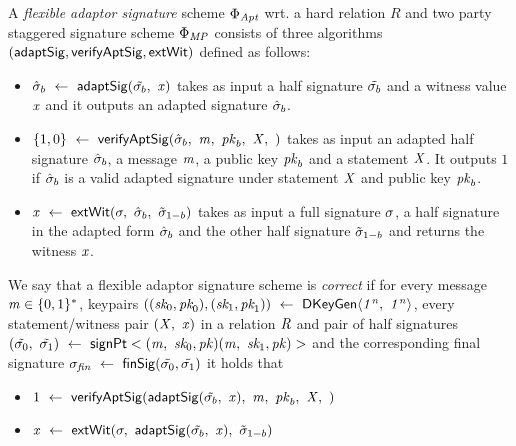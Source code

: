 \begin{definition}
A \emph{flexible adaptor signature} scheme $\Phi_{\mathit{Apt}}$ wrt. a hard relation $R$ and two party staggered signature scheme $\Phi_{\mathit{MP}}$ consists of three algorithms $(\mathsf{adaptSig}, \mathsf{verifyAptSig}, \mathsf{extWit})$ defined as follows:


\begin{itemize}
        \item $\hat{\sigma}_b ~\leftarrow~ \mathsf{adaptSig}(\tilde{\sigma_b} ,~ \mathit{x})$ takes as input a half signature $\tilde{\sigma_b}$ and a witness value $\mathit{x}$ and it outputs an adapted signature $\hat{\sigma}_b$. 
        \item $\{1,0\} ~\leftarrow~ \mathsf{verifyAptSig}(\hat{\sigma}_b ,~ \mathit{m} ,~ \mathit{pk}_b ,~ \mathit{X} ,~ )$ takes as input an adapted half signature $\hat{\sigma}_b$, a message $\mathit{m}$, a public key $\mathit{pk}_b$ and a statement $\mathit{X}$.  It outputs $1$ if $\hat{\sigma}_b$ is a valid adapted signature under statement $\mathit{X}$ and public key  $\mathit{pk}_b$. 
        \item $\mathit{x} ~\leftarrow~ \mathsf{extWit}(\sigma ,~ \hat{\sigma}_b ,~ \tilde{\sigma}_{1-b})$ takes as input a full signature $\sigma$, a half signature in the adapted form $\hat{\sigma}_b$ and the other half signature $\tilde{\sigma}_{1-b}$ and returns the witness $\mathit{x}$.
    \end{itemize}

\end{definition}




\begin{definition}
We say that a flexible adaptor signature scheme is \emph{correct} if for every message $\mathit{m} \in \{0,1\}^{*}$, keypairs $((\textit{sk}_0, \textit{pk}_0), (\textit{sk}_1, \textit{pk}_1)) ~\leftarrow~ \mathsf{DKeyGen}\langle \mathit{1^n} ,~ \mathit{1^n} \rangle$, every statement/witness pair $(\mathit{X} ,~ \mathit{x})$ in a relation $\mathit{R}$ and pair of half signatures $(\tilde{\sigma_0} ,~ \tilde{\sigma_1}) ~\leftarrow~ \mathsf{signPt}<(\mathit{m} ,~ \textit{sk}_0, \mathit{pk})(\mathit{m} ,~ \textit{sk}_1, \mathit{pk})>$ and the corresponding final signature $\sigma_{\mathit{fin}} ~\leftarrow~ \mathsf{finSig}(\tilde{\sigma_0},\tilde{\sigma_1})$ it holds that 
	
	\begin{itemize}
		\item $1 ~\leftarrow~ \mathsf{verifyAptSig}(\mathsf{adaptSig}(\tilde{\sigma_b} ,~ \mathit{x}) ,~ \mathit{m} ,~ \mathit{pk}_b ,~ \mathit{X} ,~ )$
		\item $\mathit{x} ~\leftarrow~ \mathsf{extWit}(\sigma ,~ \mathsf{adaptSig}(\tilde{\sigma_b} ,~ \mathit{x}) ,~ \tilde{\sigma}_{1-b})$
	\end{itemize}

\end{definition}


